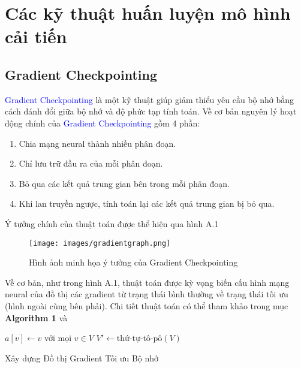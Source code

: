 \chapter{Các kỹ thuật huấn luyện mô hình cải tiến}
\large {
\section{Gradient Checkpointing}
\textcolor{blue}{Gradient Checkpointing}\cite{chen2016trainingdeepnetssublinear}
là một kỹ thuật giúp giảm thiểu yêu cầu bộ nhớ bằng cách đánh đổi giữa bộ nhớ và độ phức tạp tính toán. Về cơ bản nguyên lý hoạt động chính của \textcolor{blue}{Gradient Checkpointing} gồm 4 phần:
\begin{enumerate}
    \item Chia mạng neural thành nhiều phân đoạn.
    \item Chỉ lưu trữ đầu ra của mỗi phân đoạn.
    \item Bỏ qua các kết quả trung gian bên trong mỗi phân đoạn.
    \item Khi lan truyền ngược, tính toán lại các kết quả trung gian bị bỏ qua.
\end{enumerate}

Ý tưởng chính của thuật toán được thể hiện qua hình A.1 

\begin{figure}[h]
    \centering
    \texttt{[image: images/gradientgraph.png]}
    \caption{Hình ảnh minh họa ý tưởng của Gradient Checkpointing}
    \label{fig:your-label}
\end{figure} 
Về cơ bản, như trong hình A.1, thuật toán được kỳ vọng biến cấu hình mạng neural của đồ thị các gradient từ trạng thái bình thường về trạng thái tối ưu (hình ngoài cùng bên phải). Chi tiết thuật toán có thể tham khảo trong mục \textbf{Algorithm 1} và \cite{chen2016trainingdeepnetssublinear}

\begin{algorithm}[H]
\SetAlgoLined
{}
$a[v] \leftarrow v$ với mọi $v \in V$\;
$V' \leftarrow \text{thứ-tự-tô-pô}(V)$\;
\caption{Xây dựng Đồ thị Gradient Tối ưu Bộ nhớ}
\end{algorithm}

}
